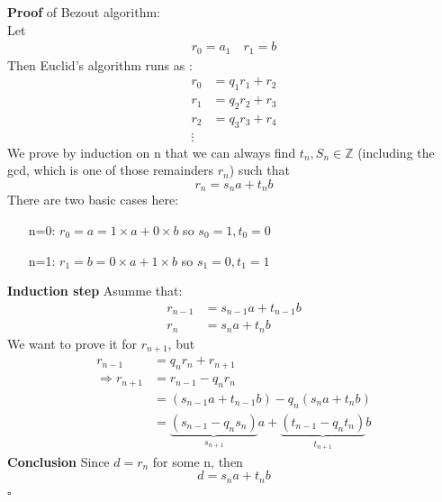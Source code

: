 \documentclass{article}
\begin{document}
\textbf{Proof} of Bezout algorithm:\\
Let \begin{align*}
    r_0 = a_1 \quad r_1 = b
\end{align*}
Then Euclid's algorithm runs as :
\begin{align*}
    r_0 & = q_1 r_1 + r_2 \\
    r_1 & = q_2 r_2 + r_3 \\
    r_2 & = q_3 r_3 + r_4 \\
    \vdots
\end{align*}
We prove by induction on n that we can always find $t_n,S_n \in \mathbb{Z} $ (including the gcd, which is one of those remainders $r_n$) such that \[
    r_n = s_n a + t_n b
\]
There are two basic cases here:
\begin{itemize}
    \item [n=0:] $r_0 =a = 1 \times a+ 0 \times b$ so $s_0 = 1, t_0 = 0$
    \item [n=1:] $r_1 =b = 0 \times a+ 1 \times b$ so $s_1 = 0, t_1 = 1$
\end{itemize}
\textbf{Induction step} Asumme that:
\begin{align*}
    r _{n-1} & = s _{n-1} a + t _{n-1} b \\
    r _{n}   & = s _{n} a + t _{n} b
\end{align*}
We want to prove it for $r _{n+1}$, but
\begin{align*}
    r _{n-1}             & =  q_nr_n + r _{n+1}                                                                        \\
    \Rightarrow r _{n+1} & =  r _{n-1} - q_nr_n                                                                        \\
                         & = (s _{n-1}a + t _{n-1} b) - q_n (s_na + t_nb)                                              \\
                         & = \underbrace{(s _{n-1} - q_ns_n)}_{s _{n+1}}a + \underbrace{(t _{n-1}-q_nt_n)}_{t _{n+1}}b
\end{align*}
\textbf{Conclusion} Since $d = r_n$ for some n, then \[
    d = s_na +t_nb
\]
\hspace*{\fill} $\square$
\end{document}

